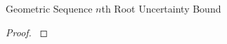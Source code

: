 \begin{theorem}{Geometric Sequence $n$th Root Uncertainty Bound}
\label{thm:geom-seq-nth-root-algo-uncertainty-bound}

\end{theorem}

\begin{proof}
\label{prf:geom-seq-nth-root-algo-uncertainty-bound}

\end{proof}
